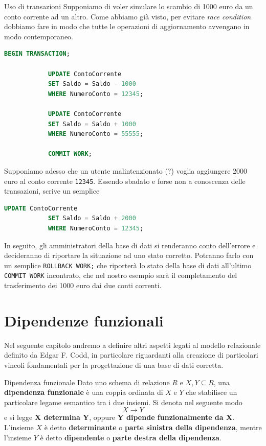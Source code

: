 \documentclass[12pt]{report}
\newcommand{\ra}{
	\rightarrow
}
\begin{document}
	\begin{esempio}{Uso di transazioni}{}
		Supponiamo di voler simulare lo scambio di 1000 euro da un conto corrente ad un altro. Come abbiamo già visto, per evitare \textit{race condition} dobbiamo fare in modo che tutte le operazioni di aggiornamento avvengano in modo contemporaneo.
		
		\begin{lstlisting}[language=SQL]
			BEGIN TRANSACTION;
			
			UPDATE ContoCorrente
			SET Saldo = Saldo - 1000
			WHERE NumeroConto = 12345;
			
			UPDATE ContoCorrente
			SET Saldo = Saldo + 1000
			WHERE NumeroConto = 55555;
			
			COMMIT WORK;
		\end{lstlisting}
		
		Supponiamo adesso che un utente malintenzionato (?) voglia aggiungere 2000 euro al conto corrente \texttt{12345}. Essendo sbadato e forse non a conoscenza delle transazioni, scrive un semplice
		\begin{lstlisting}[language=SQL]
			UPDATE ContoCorrente
			SET Saldo = Saldo + 2000
			WHERE NumeroConto = 12345;
		\end{lstlisting}
		
		In seguito, gli amministratori della base di dati si renderanno conto dell'errore e decideranno di riportare la situazione ad uno stato corretto. Potranno farlo con un semplice \texttt{ROLLBACK WORK;} che riporterà lo stato della base di dati all'ultimo \texttt{COMMIT WORK} incontrato, che nel nostro esempio sarà il completamento del trasferimento dei 1000 euro dai due conti correnti.
	\end{esempio}
	
	\chapter{Dipendenze funzionali}
	Nel seguente capitolo andremo a definire altri aspetti legati al modello relazionale definito da Edgar F. Codd, in particolare riguardanti alla creazione di particolari vincoli fondamentali per la progettazione di una base di dati corretta.
	
	\begin{definizione}{Dipendenza funzionale}{}
		Dato uno schema di relazione $R$ e $X, Y \subseteq R$, una \textbf{dipendenza funzionale} è una coppia ordinata di $X$ e $Y$ che stabilisce un particolare legame semantico tra i due insiemi. Si denota nel seguente modo
		\[
			X \ra Y
		\]
		e si legge \textbf{X determina Y}, oppure \textbf{Y dipende funzionalmente da X}.\\
		L'insieme $X$ è detto \textbf{determinante} o \textbf{parte sinistra della dipendenza}, mentre l'insieme $Y$ è detto \textbf{dipendente} o \textbf{parte destra della dipendenza}.
	\end{definizione}
	
\end{document}
